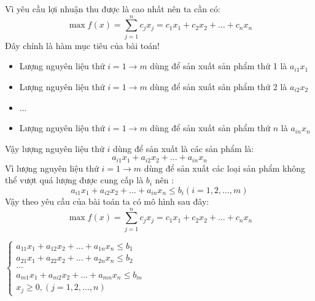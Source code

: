 \documentclass{article}
\begin{document}
\indent Vì yêu cầu lợi nhuận thu được là cao nhất nên ta cần có:
\begin{equation*}
    \max{f(x)} =\sum_{j=1}^n c_jx_j = c_1x_1 + c_2x_2 + ... + c_nx_n
\end{equation*}
\indent Đây chính là hàm mục tiêu của bài toán!
\begin{itemize}
    \item Lượng nguyên liệu thứ $i=1 \longrightarrow m$ dùng để sản xuất sản phẩm thứ 1 là $a_{i1}x_1 $
    \item Lượng nguyên liệu thứ $i=1 \longrightarrow m$ dùng để sản xuất sản phẩm thứ 2 là $a_{i2}x_2 $
    \item ...
    \item Lượng nguyên liệu thứ $i=1 \longrightarrow m$ dùng để sản xuất sản phẩm thứ $n$ là $a_{in}x_n $
\end{itemize}
\hspace{0.4cm} Vậy lượng nguyên liệu thứ $i$ dùng để sản xuất là các sản phẩm là:
\begin{equation*}
    a_{i1}x_1 + a_{i2}x_2 +...+ a_{in}x_n 
\end{equation*}
Vì lượng nguyên liệu thứ  $i=1 \longrightarrow m$ dùng để sản xuất các loại sản phẩm không thể vượt quá lượng được cung cấp là $b_i$ nên :
\begin{equation*}
    a_{i1}x_1 + a_{i2}x_2 +...+ a_{in}x_n \leq b_i (i=1,2,...,m)
\end{equation*}
Vậy theo yêu cầu của bài toán ta có mô hình sau đây:
\begin{equation*}
    \max{f(x)} =\sum_{j=1}^n c_jx_j = c_1x_1 + c_2x_2 + ... + c_nx_n
\end{equation*}
\begin{center}
    $\begin{cases}
        a_{11}x_1 + a_{12}x_2 +...+ a_{1n}x_n \leq b_1 \\
        a_{21}x_1 + a_{22}x_2 +...+ a_{2n}x_n \leq b_2 \\
        ...\\ 
        a_{m1}x_1 + a_{m2}x_2 +...+ a_{mn}x_n \leq b_m \\
        x_j \geq 0, (j=1,2,...,n)
    \end{cases}$
\end{center}
\end{document}
